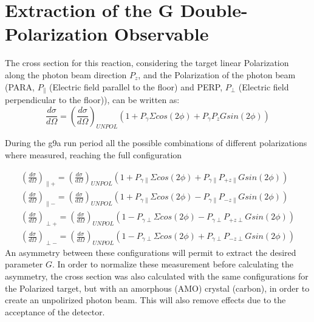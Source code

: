 \section{Extraction of the G Double-Polarization Observable}
The cross section for this reaction, considering the target linear Polarization along the photon beam direction $P_z$, and the Polarization of the photon beam (PARA, $P_{\parallel}$ (Electric field parallel to the floor) and PERP, $P_{\perp}$ (Electric field perpendicular to the floor)), can be written as:
\begin{equation}
  \frac{d\sigma}{d\Omega} = \left(\frac{d\sigma}{d\Omega}\right)_{UNPOL}  \left( 1 + P_{\gamma}\Sigma cos(2\phi) + P_{\gamma} P_z G sin(2\phi) \right)
  \label{eqn:extract_G_S}
\end{equation}

During the g9a run period all the possible combinations of different polarizations where measured, reaching the full configuration

\begin{eqnarray}
\left(\frac{d\sigma}{d\Omega}\right)_{\parallel +} = \left(\frac{d\sigma}{d\Omega}\right)_{UNPOL}  \left( 1 + P_{\gamma \parallel}\Sigma cos(2\phi) + P_{\gamma \parallel} P_{+z\parallel} G sin(2\phi) \right) \\
\left(\frac{d\sigma}{d\Omega}\right)_{\parallel -} = \left(\frac{d\sigma}{d\Omega}\right)_{UNPOL}  \left( 1 + P_{\gamma \parallel}\Sigma cos(2\phi) - P_{\gamma \parallel} P_{-z\parallel} G sin(2\phi) \right) \\
\left(\frac{d\sigma}{d\Omega}\right)_{\perp +} = \left(\frac{d\sigma}{d\Omega}\right)_{UNPOL}  \left( 1 - P_{\gamma \perp}\Sigma cos(2\phi) - P_{\gamma \perp} P_{+z\perp} G sin(2\phi) \right) \\
\left(\frac{d\sigma}{d\Omega}\right)_{\perp -} = \left(\frac{d\sigma}{d\Omega}\right)_{UNPOL}  \left( 1 - P_{\gamma \perp}\Sigma cos(2\phi) + P_{\gamma \perp} P_{-z\perp} G sin(2\phi) \right)
\end{eqnarray}
An asymmetry between these configurations will permit to extract the desired parameter $G$. In order to normalize these measurement before calculating the asymmetry, the cross section was also calculated with the same configurations for the Polarized target, but with an amorphous (AMO) crystal (carbon), in order to create an unpolirized photon beam. This will also remove effects due to the acceptance of the detector. 

